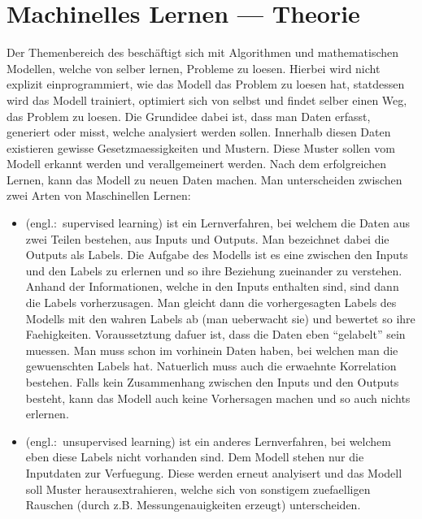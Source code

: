 \chapter{Machinelles Lernen --- Theorie}

Der Themenbereich des  beschäftigt sich mit Algorithmen und mathematischen Modellen, welche von selber lernen, Probleme zu loesen.
Hierbei wird nicht explizit einprogrammiert, wie das Modell das Problem zu loesen
hat, statdessen wird das Modell trainiert, optimiert sich von selbst und findet selber
einen Weg, das Problem zu loesen.
Die Grundidee dabei ist, dass man Daten erfasst, generiert oder misst, welche
analysiert werden sollen. Innerhalb diesen Daten existieren gewisse
Gesetzmaessigkeiten und Mustern. Diese Muster sollen vom Modell
erkannt werden und verallgemeinert werden. Nach dem erfolgreichen Lernen,
kann das Modell  zu neuen Daten machen.
\para{}
Man unterscheiden zwischen zwei Arten von Maschinellen Lernen:
\begin{itemize}
\item{
     (engl.:\ supervised learning) ist ein
    Lernverfahren, bei welchem die Daten aus zwei Teilen bestehen, aus Inputs und
    Outputs. Man bezeichnet dabei die Outputs als Labels. Die Aufgabe des Modells
    ist es eine  zwischen den Inputs und den Labels zu
    erlernen und so ihre Beziehung zueinander zu verstehen.
    Anhand der Informationen, welche in den Inputs enthalten
    sind, sind dann die Labels vorherzusagen. Man gleicht dann die
    vorhergesagten Labels des Modells mit den wahren Labels ab (man ueberwacht sie) und bewertet so ihre Faehigkeiten.
    \para{}
    Voraussetztung dafuer ist, dass die Daten eben ``gelabelt'' sein muessen.
    Man muss schon im vorhinein Daten haben, bei welchen man die gewuenschten
    Labels hat. Natuerlich muss auch die erwaehnte Korrelation bestehen. Falls
    kein Zusammenhang zwischen den Inputs und den Outputs besteht, kann das
    Modell auch keine Vorhersagen machen und so auch nichts erlernen.
  }
\item{
     (engl.:\ unsupervised learning) ist ein anderes
    Lernverfahren, bei welchem eben diese Labels nicht vorhanden sind. Dem
    Modell stehen nur die Inputdaten zur Verfuegung. Diese werden erneut analyisert
    und das Modell soll Muster herausextrahieren, welche sich von sonstigem
    zuefaelligen Rauschen (durch z.B. Messungenauigkeiten erzeugt)
    unterscheiden.
  }
\end{itemize}

